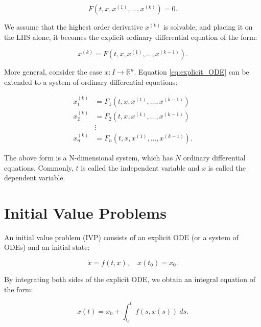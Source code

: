 \documentclass[
	parskip, 			   %
	twoside, 			   %
	DIV=14, 			   %
	BCOR=15.0mm, 		   %
	headsepline, 		   %
	open=right, 		   %
	captions=tableheading, %
	bibliography=totoc,    %
	numbers=noenddot       %
]{scrreprt}
\begin{document}
\begin{equation}
    \label{eq:implicit_ODE}
    F\left(t, x, x^{(1)}, \ldots, x^{(k)}\right)=0.
\end{equation}

We assume that the highest order derivative $x^{(k)}$ is solvable, and placing it on the LHS alone, it becomes the explicit ordinary differential equation of the form:

\begin{equation}
    \label{eq:explicit_ODE}
    x^{(k)} = F\left(t, x, x^{(1)}, \ldots, x^{(k-1)}\right).
\end{equation}

More general, consider the case $x: I \rightarrow \mathbb{R}^{n}$. Equation \ref{eq:explicit_ODE} can be extended to a system of ordinary differential equations:

\begin{equation}
    \label{eq:ODE_system}
    \begin{aligned}
    x_{1}^{(k)} &=F_{1}\left(t, x, x^{(1)}, \ldots, x^{(k-1)}\right) \\
    x_{2}^{(k)} &=F_{2}\left(t, x, x^{(1)}, \ldots, x^{(k-1)}\right) \\
    & \vdots \\
    x_{n}^{(k)} &=F_{n}\left(t, x, x^{(1)}, \ldots, x^{(k-1)}\right).
\end{aligned}
\end{equation}

The above form is a N-dimensional system, which has $N$ ordinary differential equations. Commonly, $t$ is called the independent variable and $x$ is called the dependent variable.

\section{Initial Value Problems}
An initial value problem (IVP) consists of an explicit ODE (or a system of ODEs) and an initial state:

\begin{equation}
    \label{eq:IVP}
    \dot{x} = f(t, x), \quad x(t_{0})=x_{0}.
\end{equation}

By integrating both sides of the explicit ODE, we obtain an integral equation of the form:

\begin{equation}
    \label{eq:solution_IVP}
    x(t) = x_{0} + \int_{t_{0}}^{t} f(s, x(s))\:ds.
\end{equation}
\end{document}
